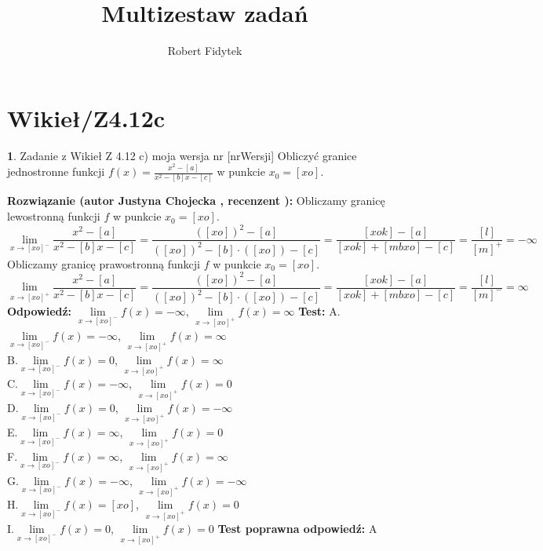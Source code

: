 \documentclass[12pt, a4paper]{article}
\title{Multizestaw zadań}
\author{Robert Fidytek}
\date{}
\theoremstyle{definition} %
\newtheorem{zad}{}
\newcommand{\kategoria}[1]{\section{#1}} %
\newcommand{\zadStart}[1]{\begin{zad}#1\newline} %
\newcommand{\zadStop}{\end{zad}}   %
\newcommand{\rozwStart}[2]{\noindent \textbf{Rozwiązanie (autor #1 , recenzent #2): }\newline} %
\newcommand{\rozwStop}{\newline}                                            %
\newcommand{\odpStart}{\noindent \textbf{Odpowiedź:}\newline}    %
\newcommand{\odpStop}{\newline}                                             %
\newcommand{\testStart}{\noindent \textbf{Test:}\newline} %
\newcommand{\testStop}{\newline} %
\newcommand{\kluczStart}{\noindent \textbf{Test poprawna odpowiedź:}\newline} %
\newcommand{\kluczStop}{\newline} %
\begin{document}
\maketitle


\kategoria{Wikieł/Z4.12c}
\zadStart{Zadanie z Wikieł Z 4.12 c) moja wersja nr [nrWersji]}
Obliczyć granice jednostronne funkcji $f(x)=\frac{x^{2}-[a]}{x^{2}-[b]x-[c]}$ w punkcie $x_{0}=[xo]$. 
\zadStop
\rozwStart{Justyna Chojecka}{}
Obliczamy granicę lewostronną funkcji $f$ w punkcie $x_{0}=[xo]$.
$$\lim\limits_{x\to [xo]^{-}}\frac{x^{2}-[a]}{x^{2}-[b]x-[c]}=\frac{([xo])^2-[a]}{([xo])^2-[b]\cdot ([xo])-[c]}=\frac{[xok]-[a]}{[xok]+[mbxo]-[c]}=\frac{[l]}{[m]^{+}}=-\infty$$
Obliczamy granicę prawostronną funkcji $f$ w punkcie $x_{0}=[xo]$.
$$\lim\limits_{x\to [xo]^{+}}\frac{x^{2}-[a]}{x^{2}-[b]x-[c]}=\frac{([xo])^2-[a]}{([xo])^2-[b]\cdot ([xo])-[c]}=\frac{[xok]-[a]}{[xok]+[mbxo]-[c]}=\frac{[l]}{[m]^{-}}=\infty$$
\rozwStop
\odpStart
$\lim\limits_{x\to [xo]^{-}}f(x)=-\infty$, $\lim\limits_{x\to [xo]^{+}}f(x)=\infty$
\odpStop
\testStart
A.$\lim\limits_{x\to [xo]^{-}}f(x)=-\infty$, $\lim\limits_{x\to [xo]^{+}}f(x)=\infty$\\
B.$\lim\limits_{x\to [xo]^{-}}f(x)=0$, $\lim\limits_{x\to [xo]^{+}}f(x)=\infty$\\
C.$\lim\limits_{x\to [xo]^{-}}f(x)=-\infty$, $\lim\limits_{x\to [xo]^{+}}f(x)=0$\\
D.$\lim\limits_{x\to [xo]^{-}}f(x)=0$, $\lim\limits_{x\to [xo]^{+}}f(x)=-\infty$\\
E.$\lim\limits_{x\to [xo]^{-}}f(x)=\infty$, $\lim\limits_{x\to [xo]^{+}}f(x)=0$\\
F.$\lim\limits_{x\to [xo]^{-}}f(x)=\infty$, $\lim\limits_{x\to [xo]^{+}}f(x)=\infty$\\
G.$\lim\limits_{x\to [xo]^{-}}f(x)=-\infty$, $\lim\limits_{x\to [xo]^{+}}f(x)=-\infty$\\
H.$\lim\limits_{x\to [xo]^{-}}f(x)=[xo]$, $\lim\limits_{x\to [xo]^{+}}f(x)=0$\\
I.$\lim\limits_{x\to [xo]^{-}}f(x)=0$, $\lim\limits_{x\to [xo]^{+}}f(x)=0$
\testStop
\kluczStart
A
\kluczStop
\end{document}
